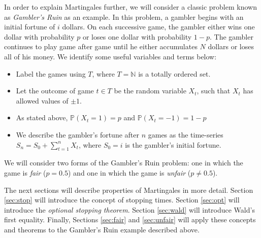 In order to explain Martingales further, we will
consider a classic problem known as {\it Gambler's Ruin} as an example.
In this problem, a gambler begins with an initial fortune
of $i$ dollars.  On each successive game, the gambler 
either wins one dollar  with probability $p$ or loses one dollar
with probability $1-p$.  The gambler continues to play
game after game until he either accumulates $N$ dollars
or loses all of his money.
We identify some useful variables and terms below:
\begin{itemize}
  \item Label the games using $T$, where $T = \mathbb{N}$ is a totally ordered set.
  \item Let the outcome of game $t \in T$ be the random variable $X_t$, such that $X_t$ has allowed values of $\pm 1$.
  \item As stated above, $\mathbb{P}(X_t = 1) = p$ and $\mathbb{P}(X_t = -1) = 1-p$
  \item We describe the gambler's fortune after $n$ games as the time-series $S_n = S_0 + \sum\limits_{t = 1}^{n}X_t$, where $S_0 = i$ is the gambler's initial fortune.
\end{itemize}
We will consider two forms of the Gambler's Ruin problem: one in which the game
is {\it fair} ($p = 0.5$) and one in which the game is {\it unfair} ($p \neq 0.5$).

The next sections will describe properties of Martingales in more detail.
Section \ref{sec:stop} will introduce the concept of stopping times.
Section \ref{sec:opt} will introduce the {\it optional stopping theorem}.
Section \ref{sec:wald} will introduce Wald's first equality.
Finally, Sections \ref{sec:fair} and \ref{sec:unfair} will apply these concepts
and theorems to the Gambler's Ruin example described above.
